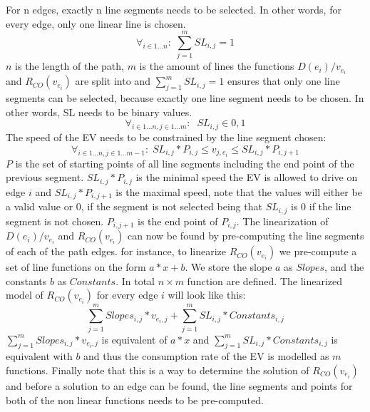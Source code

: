 For n edges, exactly n line segments needs to be selected. In other words, for every edge, only one linear line is chosen. 
\begin{equation*}
\forall_{i\in1 \dots n }:\; \sum_{j=1}^{m} SL_{i,j} = 1
\end{equation*}
$n$ is the length of the path, $m$ is the amount of lines the functions \( D(e_i)/v_{e_i} \) and $R_{CO}(v_{e_i})$ are split into and $\sum_{j=1}^{m} SL_{i,j} = 1$ ensures that only one line segments can be selected, because exactly one line segment needs to be chosen. In other words, SL needs to be binary values.
\begin{equation*}
\forall_{i\in1 \dots n, j \in 1 \dots m}: \; \; SL_{i,j} \in{0,1} 
\end{equation*}
The speed of the EV needs to be constrained by the line segment chosen:
\begin{equation*}
\forall_{i\in1 \dots n, j \in 1 \dots m-1}:\; SL_{i,j} * P_{i,j}  \le  v_{j,e_i} \le SL_{i,j}*P_{i,j+1}
\end{equation*}
$P$ is the set of starting points of all line segments including the end point of the previous segment. $SL_{i,j} * P_{i,j}$ is the minimal speed the EV is allowed to drive on edge $i$ and $SL_{i,j}*P_{i,j+1}$ is the maximal speed, note that the values will either be a valid value or $0$, if the segment is not selected being that $SL_{i,j}$ is $0$ if the line segment is not chosen. $P_{i,j+1}$ is the end point of $P_{i,j}$. 
The linearization of \( D(e_i)/v_{e_i} \) and $R_{CO}(v_{e_i})$ can now be found by pre-computing the line segments of each of the path edges. for instance, to linearize $R_{CO}(v_{e_i})$ we pre-compute a set of line functions on the form $a*x+b$. We store the slope $a$ as $Slopes$, and the constants $b$ as $Constants$. In total $n \times m$ function are defined. The linearized model of $R_{CO}(v_{e_i})$ for every edge $i$ will look like this:
\begin{equation*}
\sum_{j=1}^{m} Slopes_{i,j}*v_{e_i,j} + \sum_{j=1}^{m} SL_{i,j}*Constants_{i,j} 
\end{equation*}
$\sum_{j=1}^{m} Slopes_{i,j}*v_{e_i,j}$ is equivalent of $a*x$ and $\sum_{j=1}^{m} SL_{i,j}*Constants_{i,j}$ is equivalent with $b$ and thus the consumption rate of the EV is modelled as $m$ functions. 
Finally note that this is a way to determine the solution of $R_{CO}(v_{e_i})$ and before a solution to an edge can be found, the line segments and points for both of the non linear functions needs to be pre-computed. 


